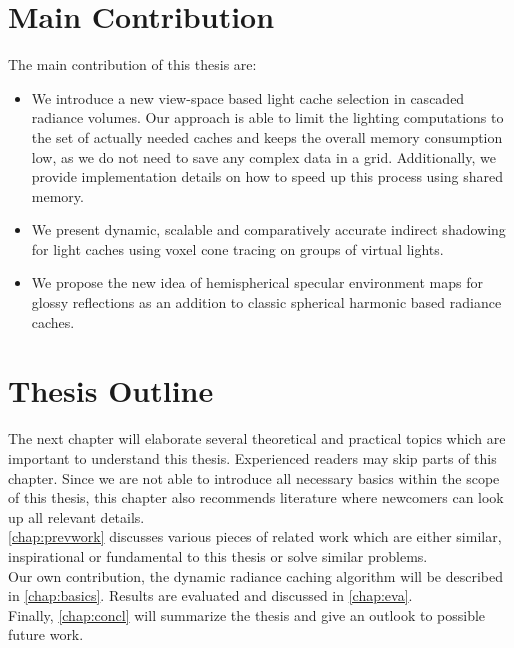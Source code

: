 \documentclass[thesis.tex]{subfiles}
\begin{document}
\section{Main Contribution}
The main contribution of this thesis are:
\begin{itemize}
\item We introduce a new view-space based light cache selection in cascaded radiance volumes. Our approach is able to limit the lighting computations to the set of actually needed caches and keeps the overall memory consumption low, as we do not need to save any complex data in a grid. Additionally, we provide implementation details on how to speed up this process using shared memory.
\item We present dynamic, scalable and comparatively accurate indirect shadowing for light caches using voxel cone tracing on groups of virtual lights.
\item We propose the new idea of hemispherical specular environment maps for glossy reflections as an addition to classic spherical harmonic based radiance caches.
\end{itemize}


\section{Thesis Outline}
The next chapter will elaborate several theoretical and practical topics which are important to understand this thesis. %
Experienced readers may skip parts of this chapter.
Since we are not able to introduce all necessary basics within the scope of this thesis, this chapter also recommends literature where newcomers can look up all relevant details.
\\
\autoref{chap:prevwork} discusses various pieces of related work which are either similar, inspirational or fundamental to this thesis or solve similar problems.
\\
Our own contribution, the dynamic radiance caching algorithm will be described in \autoref{chap:basics}.
Results are evaluated and discussed in \autoref{chap:eva}.
\\
Finally, \autoref{chap:concl} will summarize the thesis and give an outlook to possible future work.

\subfilebib %
\end{document}

